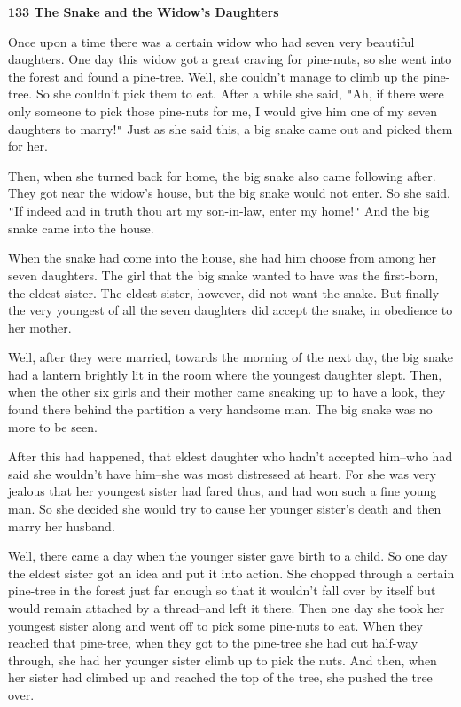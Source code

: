
\textbf{133 The Snake and the Widow's Daughters}

Once upon a time there was a certain widow who had seven very beautiful daughters.
One day this widow got a great craving for pine-nuts, so she went into the forest
and found a pine-tree. Well, she couldn't manage to climb up the pine-tree. So
she couldn't pick them to eat. After a while she said, \texttt{"}Ah, if there were
only someone to pick those pine-nuts for me, I would give him one of my seven daughters
to marry!\texttt{"} Just as she said this, a big snake came out and picked them
for her.

Then, when she turned back for home, the big snake also came following after. They
got near the widow's house, but the big snake would not enter. So she said, \texttt{"}If
indeed and in truth thou art my son-in-law, enter my home!\texttt{"} And the big
snake came into the house.

When the snake had come into the house, she had him choose from among her seven
daughters. The girl that the big snake wanted to have was the first-born, the eldest
sister. The eldest sister, however, did not want the snake. But finally the very
youngest of all the seven daughters did accept the snake, in obedience to her mother.

Well, after they were married, towards the morning of the next day, the big snake
had a lantern brightly lit in the room where the youngest daughter slept. Then,
when the other six girls and their mother came sneaking up to have a look, they
found there behind the partition a very handsome man. The big snake was no more
to be seen.

After this had happened, that eldest daughter who hadn't accepted him--who had
said she wouldn't have him--she was most distressed at heart. For she was very
jealous that her youngest sister had fared thus, and had won such a fine young
man. So she decided she would try to cause her younger sister's death and then
marry her husband.

Well, there came a day when the younger sister gave birth to a child. So one day
the eldest sister got an idea and put it into action. She chopped through a certain
pine-tree in the forest just far enough so that it wouldn't fall over by itself
but would remain attached by a thread--and left it there. Then one day she took
her youngest sister along and went off to pick some pine-nuts to eat. When they
reached that pine-tree, when they got to the pine-tree she had cut half-way through,
she had her younger sister climb up to pick the nuts. And then, when her sister
had climbed up and reached the top of the tree, she pushed the tree over.

